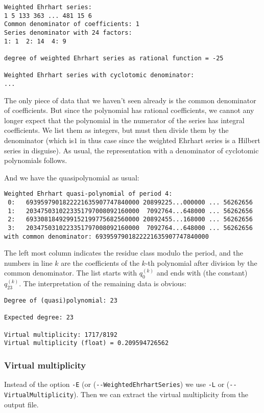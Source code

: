 \documentclass[12pt,a4paper]{scrartcl}
\theoremstyle{definition}
\begin{document}
{\begin{Verbatim}
Weighted Ehrhart series:
1 5 133 363 ... 481 15 6
Common denominator of coefficients: 1
Series denominator with 24 factors:
1: 1  2: 14  4: 9

degree of weighted Ehrhart series as rational function = -25

Weighted Ehrhart series with cyclotomic denominator:
...
\end{Verbatim}
The only piece of data that we haven't seen already is the common denominator of coefficients. But since the polynomial has rational coefficients, we cannot any longer expect that the polynomial in the numerator of the series has integral coefficients. We list them as integers, but must then divide them by the denominator (which is$1$ in thus case since the weighted Ehrhart series is a Hilbert series in disguise). As usual, the representation with a denominator of cyclotomic polynomials follows.

And we have the quasipolynomial as usual:

\begin{Verbatim}
Weighted Ehrhart quasi-polynomial of period 4:
 0:   6939597901822221635907747840000 20899225...000000 ... 56262656
 1:   2034750310223351797008092160000  7092764...648000 ... 56262656
 2:   6933081849299152199775682560000 20892455...168000 ... 56262656
 3:   2034750310223351797008092160000  7092764...648000 ... 56262656
with common denominator: 6939597901822221635907747840000
\end{Verbatim}

The left most column indicates the residue class modulo the period, and the
numbers in line $k$ are the coefficients of the $k$-th polynomial after
division by the common denominator. The list starts with $q_0^{(k)}$ and ends
with (the constant) $q_{23}^{(k)}$.
The interpretation of the remaining data is obvious:

\begin{Verbatim}
Degree of (quasi)polynomial: 23

Expected degree: 23

Virtual multiplicity: 1717/8192
Virtual multiplicity (float) = 0.209594726562
\end{Verbatim}


\subsubsection{Virtual multiplicity}

Instead of the option \verb|-E| (or (\verb|--WeightedEhrhartSeries|) we use \verb|-L| or (\verb|--VirtualMultiplicity|). Then we can extract the virtual multiplicity from the output file.

}
\end{document}
